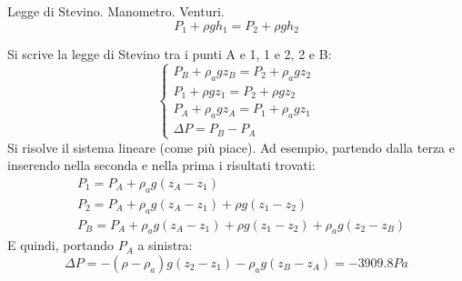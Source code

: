 \sol

\partone Legge di Stevino. Manometro. Venturi.
%
\begin{equation}
   P_1 + \rho g h_1 = P_2 + \rho g h_2
\end{equation}

\parttwo
 Si scrive la legge di Stevino tra i punti A e 1, 1 e 2, 2 e B:
\begin{equation}\label{eqn:stevino:underdet}
\begin{cases}
  P_B + \rho_a g z_B = P_2 + \rho_a g z_2  \\
  P_1 + \rho g z_1 = P_2 + \rho g z_2   \\
  P_A + \rho_a g z_A = P_1 + \rho_a g z_1 \\
  \Delta P = P_B - P_A 
\end{cases}
\end{equation}
Si risolve il sistema lineare (come più piace). Ad esempio, partendo dalla terza e inserendo nella seconda e nella prima i risultati trovati:
\begin{equation}
\begin{aligned}
 & P_1 = P_A + \rho_a g (z_A - z_1) \\
 & P_2 = P_A + \rho_a g (z_A - z_1) + \rho g (z_1 - z_2) \\
 & P_B = P_A + \rho_a g (z_A - z_1) + \rho g (z_1 - z_2) + \rho_a g (z_2 - z_B)
\end{aligned}
\end{equation}
E quindi, portando $P_A$ a sinistra:
\begin{equation}
  \Delta P = -(\rho - \rho_a) g ( z_2-z_1) - \rho_a g (z_B - z_A) = -3909.8 Pa
\end{equation}

